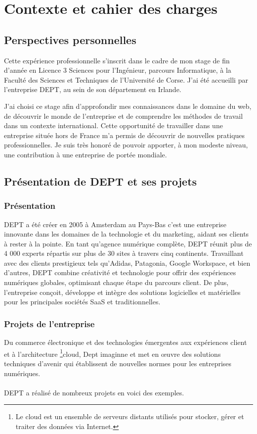 \chapter{Contexte et cahier des charges}


\section{Perspectives personnelles}
Cette expérience professionnelle s'inscrit dans le cadre de mon stage de fin d'année en Licence 3 Sciences pour l'Ingénieur, parcours Informatique, à la Faculté des Sciences et Techniques de l'Université de Corse. J'ai été accueilli par l'entreprise DEPT, au sein de son département en Irlande.

J'ai choisi ce stage afin d'approfondir mes connaissances dans le domaine du web, de découvrir le monde de l'entreprise et de comprendre les méthodes de travail dans un contexte international. Cette opportunité de travailler dans une entreprise située hors de France m'a permis de découvrir de nouvelles pratiques professionnelles. Je suis très honoré de pouvoir apporter, à mon modeste niveau, une contribution à une entreprise de portée mondiale.


\section{Présentation de DEPT et ses projets}
\subsection{Présentation}
DEPT a été créer en 2005 à Amsterdam au Pays-Bas c'est une entreprise innovante dans les domaines de la technologie et du marketing, aidant ses clients à rester à la pointe. En tant qu'agence numérique complète, DEPT réunit plus de 4 000 experts répartis sur plus de 30 sites à travers cinq continents. Travaillant avec des clients prestigieux tels qu'Adidas, Patagonia, Google Workspace, et bien d'autres, DEPT combine créativité et technologie pour offrir des expériences numériques globales, optimisant chaque étape du parcours client. De plus, l'entreprise conçoit, développe et intègre des solutions logicielles et matérielles pour les principales sociétés SaaS et traditionnelles.

\subsection{Projets de l'entreprise}
Du commerce électronique et des technologies émergentes aux expériences client et à l'architecture \footnote{Le cloud est un ensemble de serveurs distants utilisés pour stocker, gérer et traiter des données via Internet.}cloud, Dept imaginne et met en œuvre des solutions techniques d'avenir qui établissent de nouvelles normes pour les entreprises numériques.
\\ \\
DEPT a réalisé de nombreux projets en voici des exemples.


